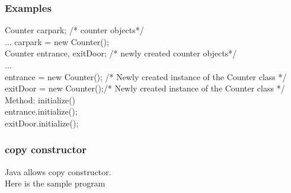 \documentclass{beamer}
\begin{document}
\begin{frame}
\frametitle{Examples}

Counter carpark; /* counter objects*/ \\
...
carpark = new Counter();\\

Counter entrance, exitDoor; /* newly created counter objects*/ \\
...\\
entrance = new Counter(); /* Newly created instance of the Counter class */ \\
exitDoor = new Counter();/* Newly created instance of the Counter class */ \\
Method: initialize()\\
entrance.initialize();\\
exitDoor.initialize();\\
\end{frame}
\begin{frame}
    \frametitle{copy constructor}
    Java allows copy constructor.\\
    Here is the sample program \href{copy_constructor.java}{\color{green}{copy constructor}}
\end{frame}
\end{document}
